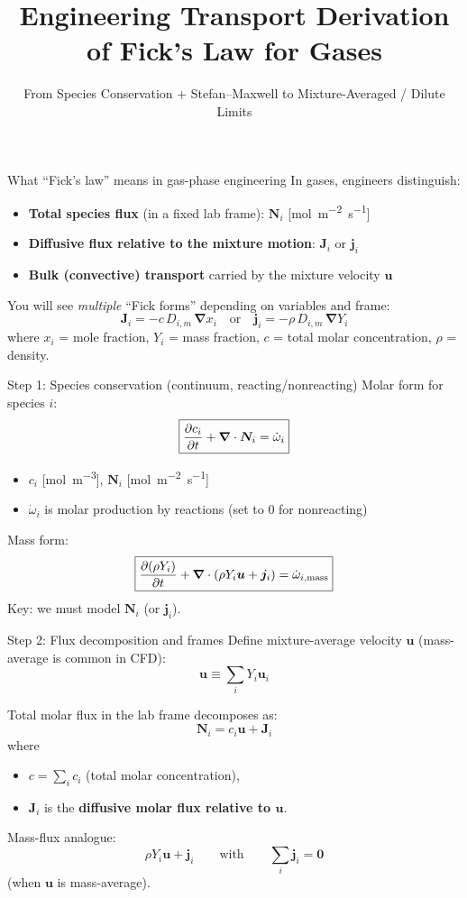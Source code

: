 \documentclass[aspectratio=169]{beamer}
\title[Fick for Gases]{Engineering Transport Derivation of Fick's Law for Gases}
\subtitle{From Species Conservation + Stefan--Maxwell to Mixture-Averaged / Dilute Limits}
\author{}
\institute{}
\date{}
\newcommand{\grad}{\bm{\nabla}}
\newcommand{\J}{\bm{J}}
\newcommand{\N}{\bm{N}}
\newcommand{\jvec}{\bm{j}}
\newcommand{\uvec}{\bm{u}}
\begin{document}
\begin{frame}
  \titlepage
\end{frame}

\begin{frame}{What ``Fick's law'' means in gas-phase engineering}
In gases, engineers distinguish:
\begin{itemize}
  \item \textbf{Total species flux} (in a fixed lab frame): $\N_i$ [\si{mol.m^{-2}.s^{-1}}]
  \item \textbf{Diffusive flux relative to the mixture motion}: $\J_i$ or $\jvec_i$
  \item \textbf{Bulk (convective) transport} carried by the mixture velocity $\uvec$
\end{itemize}

\vspace{0.3cm}
You will see \emph{multiple} ``Fick forms'' depending on variables and frame:
\[
\J_i = - c\,D_{i,m}\,\grad x_i \quad \text{or} \quad
\jvec_i = - \rho\,D_{i,m}\,\grad Y_i
\]
where $x_i$ = mole fraction, $Y_i$ = mass fraction, $c$ = total molar concentration, $\rho$ = density.
\end{frame}

\begin{frame}{Step 1: Species conservation (continuum, reacting/nonreacting)}
Molar form for species $i$:
\[
\boxed{\pdv{c_i}{t} + \grad\cdot \N_i = \dot{\omega}_i}
\]
\begin{itemize}
  \item $c_i$ [\si{mol.m^{-3}}], $\N_i$ [\si{mol.m^{-2}.s^{-1}}]
  \item $\dot{\omega}_i$ is molar production by reactions (set to 0 for nonreacting)
\end{itemize}

Mass form:
\[
\boxed{\pdv{(\rho Y_i)}{t} + \grad\cdot(\rho Y_i \uvec + \jvec_i) = \dot{\omega}_{i,\text{mass}}}
\]
Key: we must model $\N_i$ (or $\jvec_i$).
\end{frame}

\begin{frame}{Step 2: Flux decomposition and frames}
Define mixture-average velocity $\uvec$ (mass-average is common in CFD):
\[
\uvec \equiv \sum_i Y_i \uvec_i
\]

Total molar flux in the lab frame decomposes as:
\[
\boxed{\N_i = c_i \uvec + \J_i}
\]
where
\begin{itemize}
  \item $c=\sum_i c_i$ (total molar concentration),
  \item $\J_i$ is the \textbf{diffusive molar flux relative to $\uvec$}.
\end{itemize}

Mass-flux analogue:
\[
\boxed{\rho Y_i \uvec + \jvec_i}
\qquad\text{with}\qquad \sum_i \jvec_i = \bm{0}
\]
(when $\uvec$ is mass-average).
\end{frame}
\end{document}
